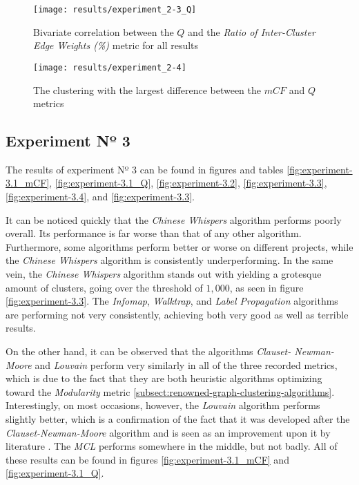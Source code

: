 \documentclass[12pt,a4paper]{report}
\begin{document}
\begin{figure}[htbp]
\centering
\texttt{[image: results/experiment\_2-3\_Q]}
\caption{Bivariate correlation between the $Q$ and the \textit{Ratio of Inter-Cluster Edge Weights (\%)} metric for all results}
\label{fig:experiment-2.3_Q}
\end{figure}

\begin{figure}[htbp]
\centering
\texttt{[image: results/experiment\_2-4]}
\caption{The clustering with the largest difference between the $mCF$ and $Q$ metrics}
\label{fig:experiment-2.4}
\end{figure}


\subsection{Experiment Nº 3}

The results of experiment Nº 3 can be found in figures and tables
\ref{fig:experiment-3.1_mCF}, \ref{fig:experiment-3.1_Q}, \ref{fig:experiment-3.2},
\ref{fig:experiment-3.3}, \ref{fig:experiment-3.4}, and \ref{fig:experiment-3.3}.

It can be noticed quickly that the \textit{Chinese Whispers} algorithm performs
poorly overall. Its performance is far worse than that of any other algorithm.
Furthermore, some algorithms perform better or worse on different projects,
while the \textit{Chinese Whispers} algorithm is consistently underperforming.
In the same vein, the \textit{Chinese Whispers} algorithm stands out with
yielding a grotesque amount of clusters, going over the threshold of $1,000$,
as seen in figure \ref{fig:experiment-3.3}. The \textit{Infomap},
\textit{Walktrap}, and \textit{Label Propagation} algorithms are performing not
very consistently, achieving both very good as well as terrible results.

On the other hand, it can be observed that the algorithms \textit{Clauset-
Newman-Moore} and \textit{Louvain} perform very similarly in all of the three
recorded metrics, which is due to the fact that they are both heuristic
algorithms optimizing toward the \textit{Modularity} metric
\ref{subsect:renowned-graph-clustering-algorithms}. Interestingly, on most occasions,
however, the \textit{Louvain} algorithm performs slightly better, which is a
confirmation of the fact that it was developed after the \textit{Clauset-Newman-Moore}
algorithm and is seen as an improvement upon it by literature
\cite{lancichinetti2009community}. The \textit{MCL} performs somewhere in the middle,
but not badly. All of these results can be found in figures
\ref{fig:experiment-3.1_mCF} and \ref{fig:experiment-3.1_Q}.
\end{document}
